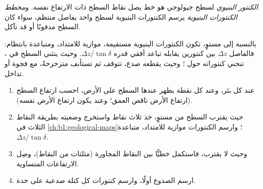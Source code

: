 \begin{definition}\label{def:b1:cross-sections:structure-contour}
\emph{الكنتور البنيوي} لسطح جيولوجي هو خط يصل نقاط السطح ذات الارتفاع نفسه. و\emph{مخطط الكنتورات البنيوية} يرسم الكنتورات البنيوية لسطح واحد بفاصل منتظم، سواء كان السطح مدفونًا أو قد تآكل.
\end{definition}

بالنسبة إلى مستوٍ، تكون الكنتورات البنيوية مستقيمة، موازية للامتداد، ومتباعدة بانتظام: فالفاصل $\Delta z$ بين كنتورين يقابله تباعد أفقي قدره $\Delta z/\tan\delta$. وحيث ينثني السطح في ، تنحني كنتوراته حول ؛ وحيث يقطعه صدع، تتوقف ثم تستأنف متزحزحةً، مع فجوة أو تداخل.

\begin{method}\label{met:b1:cross-sections:structure-contours}
\begin{enumerate}
  \item عند كل بئر، وعند كل نقطة يظهر عندها السطح على الأرض، احسب ارتفاع السطح (ارتفاع الأرض ناقص العمق؛ وعند  يكون ارتفاع الأرض نفسه).
  \item حيث يقترب السطح من مستوٍ، خذ ثلاث نقاط واستخرج وضعيته بطريقة النقاط الثلاث في \cref{ch:b1:geological-maps}؛ وارسم الكنتورات موازية للامتداد، متباعدة $\Delta z/\tan\delta$.
  \item وحيث لا يقترب، فاستكمل خطيًّا بين النقاط المجاورة (مثلثات من النقاط)، وصِل الارتفاعات المتساوية.
  \item ارسم الصدوع أولًا، وارسم كنتورات كل كتلة صدعية على حدة.
\end{enumerate}
\end{method}


